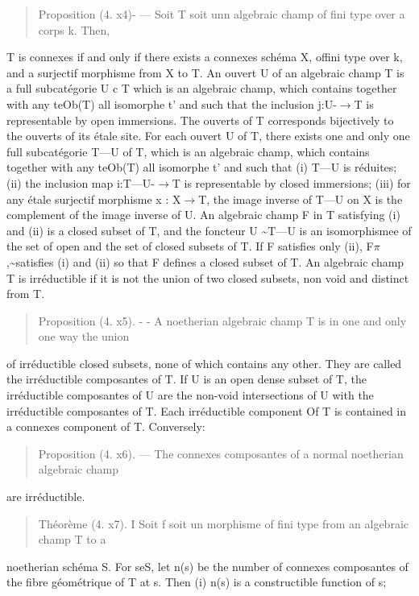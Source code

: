 \documentclass[11pt]{article}
\theoremstyle{plain}
\theoremstyle{definition}
\theoremstyle{remark}
\begin{document}
\begin{quote}Proposition (4. x4)- --- Soit T soit unn algebraic champ of fini type over a corps k. Then,\end{quote}
T is connexes if and only if there exists a connexes sch\'ema X, offini type over k, and a surjectif morphisme from X to T. An ouvert U of an algebraic champ T is a full subcat\'egorie U c T which is an algebraic champ, which contains together with any teOb(T) all isomorphe t' and such that the inclusion j:U-$\to$T is representable by open immersions. The ouverts of T corresponds bijectively to the ouverts of its \'etale site. For each ouvert U of T, there exists one and only one full subcat\'egorie T---U of T, which is an algebraic champ, which contains together with any teOb(T) all isomorphe t' and such that (i) T---U is r\'eduites; (ii) the inclusion map i:T---U-$\to$T is representable by closed immersions; (iii) for any \'etale surjectif morphisme x : X$\to$T, the image inverse of T---U on X is the complement of the image inverse of U. An algebraic champ F in T satisfying (i) and (ii) is a closed subset of T, and the foncteur U \textasciitilde{}T---U is an isomorphismee of the set of open and the set of closed subsets of T. If F satisfies only (ii), F$\pi$,\textasciitilde{}satisfies (i) and (ii) so that F defines a closed subset of T. An algebraic champ T is irr\'eductible if it is not the union of two closed subsets, non void and distinct from T.

\begin{quote}Proposition (4. x5). - - A noetherian algebraic champ T is in one and only one way the union\end{quote}
of irr\'eductible closed subsets, none of which contains any other. They are called the irr\'eductible composantes of T. If U is an open dense subset of T, the irr\'eductible composantes of U are the non-void intersections of U with the irr\'eductible composantes of T. Each irr\'eductible component Of T is contained in a connexes component of T. Conversely:

\begin{quote}Proposition (4. x6). --- The connexes composantes of a normal noetherian algebraic champ\end{quote}
are irr\'eductible.

\begin{quote}Th\'eor\`eme (4. x7). I Soit f soit un morphisme of fini type from an algebraic champ T to a\end{quote}
noetherian sch\'ema S. For seS, let n(s) be the number of connexes composantes of the fibre g\'eom\'etrique of T at s. Then (i) n(s) is a constructible function of s;
\end{document}
